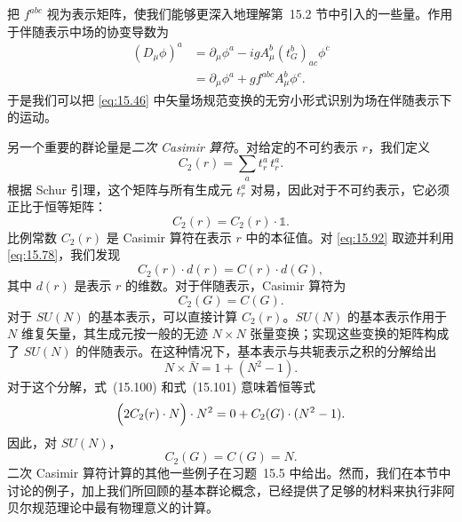 把 $f^{abc}$ 视为表示矩阵，使我们能够更深入地理解第~15.2 节中引入的一些量。作用于伴随表示中场的协变导数为
\begin{equation}
  \begin{aligned}
    (D_\mu\phi)^a &= \partial_\mu\phi^a - igA_\mu^b(t^b_G)_{ac}\phi^c\\
    &= \partial_\mu\phi^a + gf^{abc}A_\mu^b\phi^c .
  \end{aligned}
  \label{eq:15.86}
\end{equation}
于是我们可以把 \eqref{eq:15.46} 中矢量场规范变换的无穷小形式识别为场在伴随表示下的运动。

另一个重要的群论量是\emph{二次 Casimir 算符}。对给定的不可约表示 $r$，我们定义
\begin{equation}
  C_2(r) = \sum_a t^a_r\,t^a_r .
  \label{eq:15.92}
\end{equation}
根据 Schur 引理，这个矩阵与所有生成元 $t^a_r$ 对易，因此对于不可约表示，它必须正比于恒等矩阵：
\begin{equation}
  C_2(r) = C_2(r)\cdot\mathbb{1} .
  \label{eq:15.93}
\end{equation}
比例常数 $C_2(r)$ 是 Casimir 算符在表示 $r$ 中的本征值。对 \eqref{eq:15.92} 取迹并利用 \eqref{eq:15.78}，我们发现
\begin{equation}
  C_2(r)\cdot d(r) = C(r)\cdot d(G) ,
  \label{eq:15.94}
\end{equation}
其中 $d(r)$ 是表示 $r$ 的维数。对于伴随表示，Casimir 算符为
\begin{equation}
  C_2(G) = C(G) .
\end{equation}
对于 $SU(N)$ 的基本表示，可以直接计算 $C_2(r)$。$SU(N)$ 的基本表示作用于 $N$ 维复矢量，其生成元按一般的无迹 $N\times N$ 张量变换；实现这些变换的矩阵构成了 $SU(N)$ 的伴随表示。在这种情况下，基本表示与共轭表示之积的分解给出
\begin{equation}
  N\times\bar{N} = 1 + (N^2-1) .
  \label{eq:15.102}
\end{equation}
对于这个分解，式~(15.100) 和式~(15.101) 意味着恒等式
\begin{equation}
  \Bigl( 2C_2(r)\cdot N \Bigr) \cdot N^2 = 0 + C_2(G)\cdot(N^2-1) .
  \label{eq:15.103}
\end{equation}
因此，对 $SU(N)$，
\begin{equation}
  C_2(G) = C(G) = N .
  \label{eq:15.104}
\end{equation}
二次 Casimir 算符计算的其他一些例子在习题~15.5 中给出。然而，我们在本节中讨论的例子，加上我们所回顾的基本群论概念，已经提供了足够的材料来执行非阿贝尔规范理论中最有物理意义的计算。

